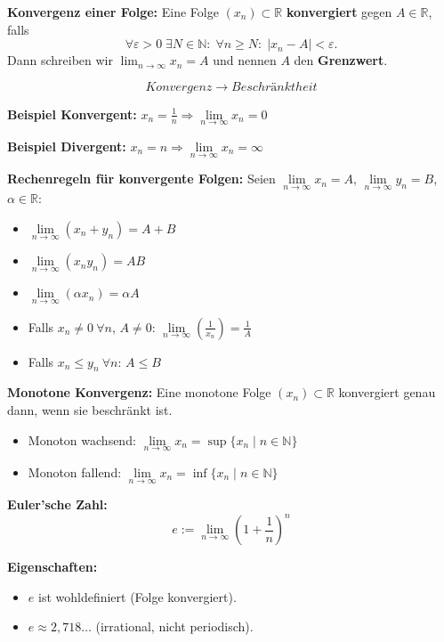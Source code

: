 \textbf{Konvergenz einer Folge:}  
Eine Folge \( (x_n) \subset \mathbb{R} \) \textbf{konvergiert} gegen \( A \in \mathbb{R} \), falls  
\[
\forall \varepsilon > 0\; \exists N \in \mathbb{N}:\; \forall n \geq N:\; |x_n - A| < \varepsilon.
\]  
Dann schreiben wir \( \lim_{n \to \infty} x_n = A \) und nennen \( A \) den \textbf{Grenzwert}.

\[
Konvergenz \to Beschränktheit
\]  

\textbf{Beispiel Konvergent:} \( x_n = \frac{1}{n} \Rightarrow \lim\limits_{n \to \infty} x_n = 0 \)

\textbf{Beispiel Divergent:} \( x_n = n \Rightarrow \lim\limits_{n \to \infty} x_n = \infty \)

\textbf{Rechenregeln für konvergente Folgen:}  
Seien \( \lim\limits_{n \to \infty} x_n = A \), \( \lim\limits_{n \to \infty} y_n = B \), \( \alpha \in \mathbb{R} \):

\begin{itemize}
  \item \( \lim\limits_{n \to \infty} (x_n + y_n) = A + B \)
  \item \( \lim\limits_{n \to \infty} (x_n y_n) = AB \)
  \item \( \lim\limits_{n \to \infty} (\alpha x_n) = \alpha A \)
  \item Falls \( x_n \neq 0\ \forall n \), \( A \neq 0 \):  
        \( \lim\limits_{n \to \infty} \left( \frac{1}{x_n} \right) = \frac{1}{A} \)
  \item Falls \( x_n \leq y_n\ \forall n \): \( A \leq B \)
\end{itemize}

\textbf{Monotone Konvergenz:}  
Eine monotone Folge \( (x_n) \subset \mathbb{R} \) konvergiert genau dann, wenn sie beschränkt ist.

\begin{itemize}
  \item Monoton wachsend:  
  \( \lim\limits_{n \to \infty} x_n = \sup \{ x_n \mid n \in \mathbb{N} \} \)

  \item Monoton fallend:  
  \( \lim\limits_{n \to \infty} x_n = \inf \{ x_n \mid n \in \mathbb{N} \} \)
\end{itemize}

\textbf{Euler'sche Zahl:}  
\[
e := \lim\limits_{n \to \infty} \left( 1 + \frac{1}{n} \right)^n
\]

\textbf{Eigenschaften:}
\begin{itemize}
  \item \( e \) ist wohldefiniert (Folge konvergiert).
  \item \( e \approx 2{,}718\ldots \) (irrational, nicht periodisch).
\end{itemize}

